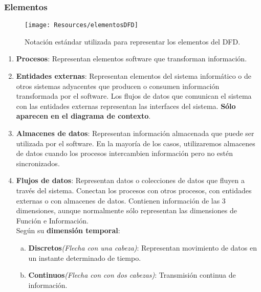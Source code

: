 \subsubsection{Elementos}

\begin{figure}[H]
    \centering
    \texttt{[image: Resources/elementosDFD]}
    \caption{Notación estándar utilizada para representar los elementos del DFD.}
    \label{fig:elementosDFD}
\end{figure}
\begin{enumerate}
    \item \textbf{Procesos}: Representan elementos software que transforman información.

    \item \textbf{Entidades externas}: Representan elementos del sistema informático o de otros sistemas adyacentes que producen o consumen información transformada por el software. Los flujos de datos que comunican el sistema con las entidades externas representan las interfaces del sistema. \textbf{Sólo aparecen en el diagrama de contexto}.

    \item \textbf{Almacenes de datos}: Representan información almacenada que puede ser utilizada por el software. En la mayoría de los casos, utilizaremos almacenes de datos cuando los procesos intercambien información pero no estén sincronizados.

    \item \textbf{Flujos de datos}: Representan datos o colecciones de datos que fluyen a través del sistema. Conectan los procesos con otros procesos, con entidades externas o con almacenes de datos. Contienen información de las 3 dimensiones, aunque normalmente sólo representan las dimensiones de Función e Información.\\
          Según su \textbf{dimensión temporal}:
          \begin{enumerate}[a.]
              \item \textbf{Discretos}\textit{(Flecha con una cabeza)}: Representan movimiento de datos en un instante determinado de tiempo.
              \item \textbf{Continuos}\textit{(Flecha con con dos cabezas)}: Transmisión continua de información.
          \end{enumerate}
\end{enumerate}

